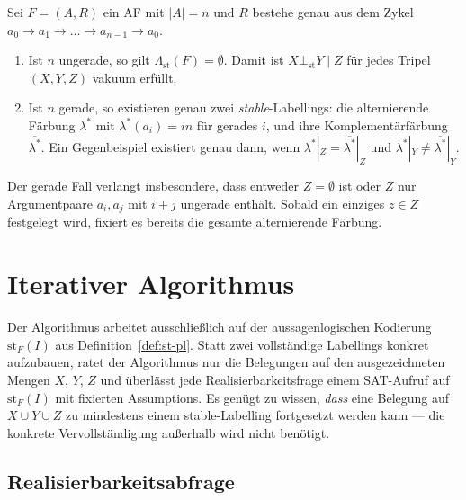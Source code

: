 Sei \(F=(A,R)\) ein AF mit \(|A|=n\) und \(R\) bestehe genau aus dem Zykel
\(a_0\to a_1 \to \dots \to a_{n-1} \to a_0\).

\begin{Lemma}
    \label{lem:zykel-st}
    \begin{enumerate}
        \item Ist \(n\) ungerade, so gilt
              \(\varLambda_{\mathrm{st}}(F)=\emptyset\). Damit ist
              \(X \bot_{\mathrm{st}} Y \mid Z\) für jedes Tripel
              \((X,Y,Z)\) vakuum erfüllt.
        \item Ist \(n\) gerade, so existieren genau zwei
              \textit{stable}-Labellings: die alternierende Färbung
              \(\lambda^*\) mit \(\lambda^*(a_i)=\mathit{in}\) für
              gerades \(i\), und ihre Komplementärfärbung
              \(\overline{\lambda^*}\). Ein Gegenbeispiel existiert
              genau dann, wenn
              \(\lambda^*|_Z = \overline{\lambda^*}|_Z\) und
              \(\lambda^*|_Y \neq \overline{\lambda^*}|_Y\).
    \end{enumerate}
\end{Lemma}

Der gerade Fall verlangt insbesondere, dass entweder \(Z=\emptyset\) ist oder
\(Z\) nur Argumentpaare \(a_i,a_j\) mit \(i+j\) ungerade enthält. Sobald ein
einziges \(z\in Z\) festgelegt wird, fixiert es bereits die gesamte
alternierende Färbung.

\section{Iterativer Algorithmus}
\label{sec:intra-scc-iter}

Der Algorithmus arbeitet ausschließlich auf der aussagenlogischen
Kodierung \(\mathrm{st}_F(I)\) aus Definition~\ref{def:st-pl}. Statt
zwei vollständige Labellings konkret aufzubauen, ratet der Algorithmus
nur die Belegungen auf den ausgezeichneten Mengen \(X\), \(Y\), \(Z\)
und überlässt jede Realisierbarkeitsfrage einem SAT-Aufruf auf
\(\mathrm{st}_F(I)\) mit fixierten Assumptions. Es genügt zu wissen,
\emph{dass} eine Belegung auf \(X\cup Y\cup Z\) zu mindestens einem
stable-Labelling fortgesetzt werden kann --- die konkrete
Vervollständigung außerhalb wird nicht benötigt.

\subsection{Realisierbarkeitsabfrage}
\label{subsec:intra-scc-realize}

